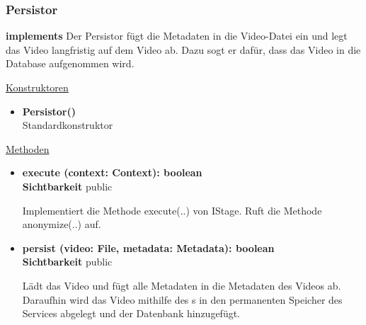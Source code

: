 \subsubsection{Persistor} \label{service:klasse:Persistor}
\textbf{implements}  \newline
Der Persistor fügt die Metadaten in die Video-Datei ein und legt das Video langfristig auf dem Video ab. Dazu sogt er dafür, dass das Video in die Database aufgenommen wird.\newline

\underline{Konstruktoren}
\begin{itemize}
\itemsep0pt
\item \textbf{Persistor()} \hfill\\

Standardkonstruktor
\end{itemize}

\underline{Methoden}
\begin{itemize}
\itemsep0pt
\item \textbf{execute (context: Context): boolean}\hfill\\
\textbf{Sichtbarkeit} public

Implementiert die Methode execute(..) von IStage. Ruft die Methode anonymize(..) auf.

\item \textbf{persist (video: File, metadata: Metadata): boolean}\hfill\\
\textbf{Sichtbarkeit} public

Lädt das Video und fügt alle Metadaten in die Metadaten des Videos ab. Daraufhin wird das Video mithilfe des s in den permanenten Speicher des Services abgelegt und der Datenbank hinzugefügt.

\end{itemize}